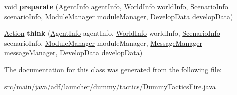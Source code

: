 \begin{DoxyCompactItemize}
\item 
\hypertarget{classadf_1_1launcher_1_1dummy_1_1tactics_1_1DummyTacticsFire_a12abee7c65713588f85d350ec60c6566}{}\label{classadf_1_1launcher_1_1dummy_1_1tactics_1_1DummyTacticsFire_a12abee7c65713588f85d350ec60c6566} 
void {\bfseries preparate} (\hyperlink{classadf_1_1agent_1_1info_1_1AgentInfo}{Agent\+Info} agent\+Info, \hyperlink{classadf_1_1agent_1_1info_1_1WorldInfo}{World\+Info} world\+Info, \hyperlink{classadf_1_1agent_1_1info_1_1ScenarioInfo}{Scenario\+Info} scenario\+Info, \hyperlink{classadf_1_1agent_1_1module_1_1ModuleManager}{Module\+Manager} module\+Manager, \hyperlink{classadf_1_1agent_1_1develop_1_1DevelopData}{Develop\+Data} develop\+Data)
\item 
\hypertarget{classadf_1_1launcher_1_1dummy_1_1tactics_1_1DummyTacticsFire_a992422564c275d1ab19d63ece7bbe142}{}\label{classadf_1_1launcher_1_1dummy_1_1tactics_1_1DummyTacticsFire_a992422564c275d1ab19d63ece7bbe142} 
\hyperlink{classadf_1_1agent_1_1action_1_1Action}{Action} {\bfseries think} (\hyperlink{classadf_1_1agent_1_1info_1_1AgentInfo}{Agent\+Info} agent\+Info, \hyperlink{classadf_1_1agent_1_1info_1_1WorldInfo}{World\+Info} world\+Info, \hyperlink{classadf_1_1agent_1_1info_1_1ScenarioInfo}{Scenario\+Info} scenario\+Info, \hyperlink{classadf_1_1agent_1_1module_1_1ModuleManager}{Module\+Manager} module\+Manager, \hyperlink{classadf_1_1agent_1_1communication_1_1MessageManager}{Message\+Manager} message\+Manager, \hyperlink{classadf_1_1agent_1_1develop_1_1DevelopData}{Develop\+Data} develop\+Data)
\end{DoxyCompactItemize}


The documentation for this class was generated from the following file\+:\begin{DoxyCompactItemize}
\item 
src/main/java/adf/launcher/dummy/tactics/Dummy\+Tactics\+Fire.\+java\end{DoxyCompactItemize}
